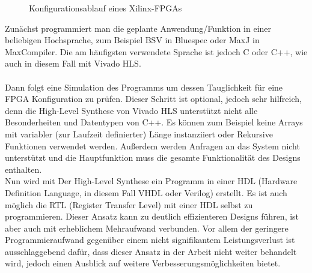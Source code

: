 \begin{figure}
\caption{Konfigurationsablauf eines Xilinx-FPGAs}
\end{figure}
Zunächst programmiert man die geplante Anwendung/Funktion in einer beliebigen Hochsprache, zum Beispiel BSV in Bluespec oder MaxJ in MaxCompiler. Die am häufigsten verwendete Sprache ist jedoch C oder C++, wie auch in diesem Fall mit Vivado HLS.\cite{NASI}\\\\ Dann folgt eine Simulation des Programms um dessen Tauglichkeit für eine FPGA Konfiguration zu prüfen. Dieser Schritt ist optional, jedoch sehr hilfreich, denn die High-Level Synthese von Vivado HLS unterstützt nicht alle Besonderheiten und Datentypen von C++. Es können zum Beispiel keine Arrays mit variabler (zur Laufzeit definierter) Länge instanziiert oder Rekursive Funktionen verwendet werden. Außerdem werden Anfragen an das System nicht unterstützt und die Hauptfunktion muss die gesamte Funktionalität des Designs enthalten.\cite{XIL2}\\Nun wird mit Der High-Level Synthese ein Programm in einer HDL (Hardware Definition Language, in diesem Fall VHDL oder Verilog) erstellt. Es ist auch möglich die RTL (Register Transfer Level) mit einer HDL selbst zu programmieren. Dieser Ansatz kann zu deutlich effizienteren Designs führen, ist aber auch mit erheblichem Mehraufwand verbunden. Vor allem der geringere Programmieraufwand gegenüber einem nicht signifikantem Leistungsverlust ist ausschlaggebend dafür, dass dieser Ansatz in der Arbeit nicht weiter behandelt wird, jedoch einen Ausblick auf weitere Verbesserungsmöglichkeiten bietet.\\
